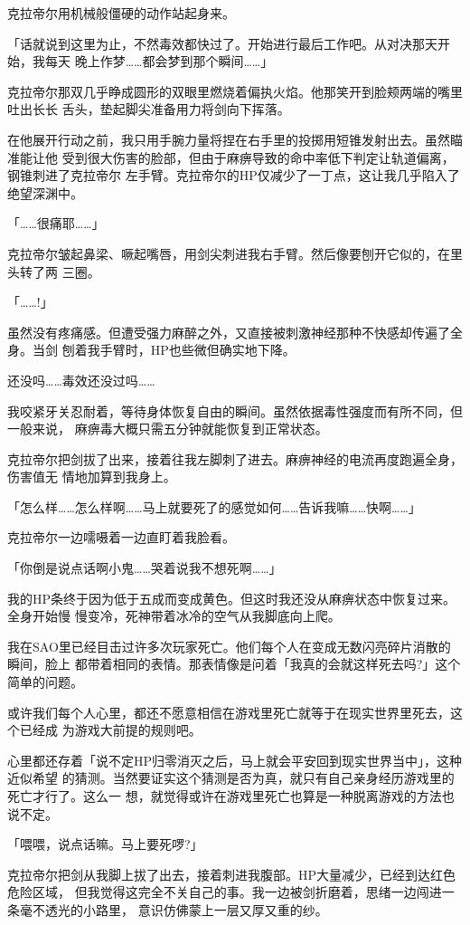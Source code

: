 \documentclass[11pt]{book}
\begin{document}
克拉帝尔用机械般僵硬的动作站起身来。

「话就说到这里为止，不然毒效都快过了。开始进行最后工作吧。从对决那天开始，我每天
晚上作梦……都会梦到那个瞬间……」

克拉帝尔那双几乎睁成圆形的双眼里燃烧着偏执火焰。他那笑开到脸颊两端的嘴里吐出长长
舌头，垫起脚尖准备用力将剑向下挥落。

在他展开行动之前，我只用手腕力量将捏在右手里的投掷用短锥发射出去。虽然瞄准能让他
受到很大伤害的脸部，但由于麻痹导致的命中率低下判定让轨道偏离，钢锥刺进了克拉帝尔
左手臂。克拉帝尔的HP仅减少了一丁点，这让我几乎陷入了绝望深渊中。

「……很痛耶……」

克拉帝尔皱起鼻梁、噘起嘴唇，用剑尖刺进我右手臂。然后像要刨开它似的，在里头转了两
三圈。

「……!」

虽然没有疼痛感。但遭受强力麻醉之外，又直接被刺激神经那种不快感却传遍了全身。当剑
刨着我手臂时，HP也些微但确实地下降。

还没吗……毒效还没过吗……

我咬紧牙关忍耐着，等待身体恢复自由的瞬间。虽然依据毒性强度而有所不同，但一般来说，
麻痹毒大概只需五分钟就能恢复到正常状态。

克拉帝尔把剑拔了出来，接着往我左脚刺了进去。麻痹神经的电流再度跑遍全身，伤害值无
情地加算到我身上。

「怎么样……怎么样啊……马上就要死了的感觉如何……告诉我嘛……快啊……」

克拉帝尔一边嚅嗫着一边直盯着我脸看。

「你倒是说点话啊小鬼……哭着说我不想死啊……」

我的HP条终于因为低于五成而变成黄色。但这时我还没从麻痹状态中恢复过来。全身开始慢
慢变冷，死神带着冰冷的空气从我脚底向上爬。

我在SAO里已经目击过许多次玩家死亡。他们每个人在变成无数闪亮碎片消散的瞬间，脸上
都带着相同的表情。那表情像是问着「我真的会就这样死去吗?」这个简单的问题。

或许我们每个人心里，都还不愿意相信在游戏里死亡就等于在现实世界里死去，这个已经成
为游戏大前提的规则吧。

心里都还存着「说不定HP归零消灭之后，马上就会平安回到现实世界当中」，这种近似希望
的猜测。当然要证实这个猜测是否为真，就只有自己亲身经历游戏里的死亡才行了。这么一
想，就觉得或许在游戏里死亡也算是一种脱离游戏的方法也说不定。

「喂喂，说点话嘛。马上要死啰?」

克拉帝尔把剑从我脚上拔了出去，接着刺进我腹部。HP大量减少，已经到达红色危险区域，
但我觉得这完全不关自己的事。我一边被剑折磨着，思绪一边闯进一条毫不透光的小路里，
意识仿佛蒙上一层又厚又重的纱。
\end{document}
